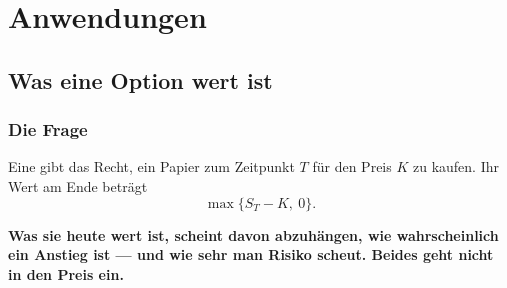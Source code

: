 \part{Anwendungen}

\chapter{Was eine Option wert ist}

\section{Die Frage}

\begin{merksatz}
Eine  gibt das Recht, ein Papier zum Zeitpunkt $T$ für den Preis $K$ zu kaufen. Ihr Wert am Ende beträgt
\[ \max\{S_T - K,\ 0\} . \]

\begin{center}
\begin{minipage}{0.9\textwidth}
\textbf{Was sie heute wert ist, scheint davon abzuhängen, wie wahrscheinlich ein Anstieg ist --- und wie sehr man Risiko scheut. Beides geht nicht in den Preis ein.}
\end{minipage}
\end{center}

\begin{center}
\begin{minipage}{0.88\textwidth}
\end{minipage}
\end{center}
\end{merksatz}


